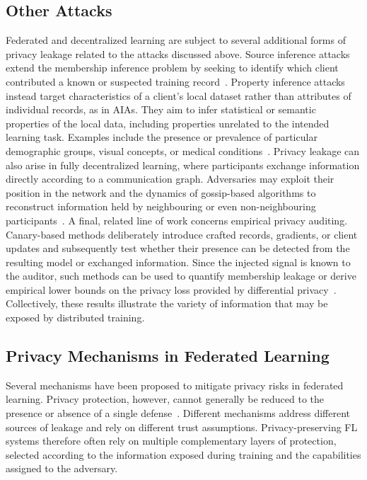 \subsection{Other Attacks}
Federated and decentralized learning are subject to several additional forms of privacy leakage related to the attacks discussed above. Source inference attacks extend the membership inference problem by seeking to identify which client contributed a known or suspected training record~\cite{hu2021sourceinferenceattacksfederated, Hu2024sia, ijcai2025p536}. Property inference attacks instead target characteristics of a client's local dataset rather than attributes of individual records, as in AIAs. They aim to infer statistical or semantic properties of the local data, including properties unrelated to the intended learning task. Examples include the presence or prevalence of particular demographic groups, visual concepts, or medical conditions~\cite{melis2018exploitingunintendedfeatureleakage, Zhang_pia, Wang_pia, Kerkouche_pia}. 
Privacy leakage can also arise in fully decentralized learning, where participants exchange information directly according to a communication graph. Adversaries may exploit their position in the network and the dynamics of gossip-based algorithms to reconstruct information held by neighbouring or even non-neighbouring participants~\cite{Pasquini_insecurity, ElMrini_graph}. A final, related line of work concerns empirical privacy auditing. Canary-based methods deliberately introduce crafted records, gradients, or client updates and subsequently test whether their presence can be detected from the resulting model or exchanged information. Since the injected signal is known to the auditor, such methods can be used to quantify membership leakage or derive empirical lower bounds on the privacy loss provided by differential privacy~\cite{maddock2023canife, Nasr_tight_auditing, andrew2024oneshot}. Collectively, these results illustrate the variety of information that may be exposed by distributed training. 

\subsection{Privacy Mechanisms in Federated Learning}\label{sec:privacy_mechanisms}
Several mechanisms have been proposed to mitigate privacy risks in federated learning. Privacy protection, however, cannot generally be reduced to the presence or absence of a single defense~\cite{kairouz_open_problems}. Different mechanisms address different sources of leakage and rely on different trust assumptions. Privacy-preserving FL systems therefore often rely on multiple complementary layers of protection, selected according to the information exposed during training and the capabilities assigned to the adversary.

